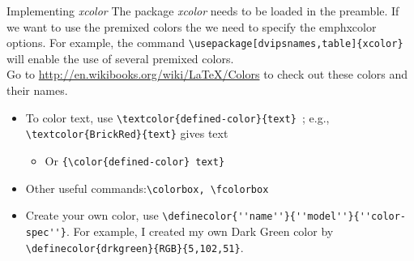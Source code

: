 \documentclass{beamer}\usepackage[]{graphicx}\usepackage[]{color}
\begin{document}
\begin{frame}[fragile]{Implementing \emph{\textrm{xcolor}}}
\textrm{The package \emph{\textrm{xcolor}} needs to be loaded in the preamble. If we want to use the premixed colors the we need to specify the emph{\textrm{xcolor}} options. For example, the command}  \verb=\usepackage[dvipsnames,table]{xcolor}= \textrm{will enable the use of several premixed colors. \\
Go to \url{http://en.wikibooks.org/wiki/LaTeX/Colors} to check out these colors and their names.}

\begin{itemize}
  \item To color text, use \verb=\textcolor{defined-color}{text} =; e.g., \verb=\textcolor{BrickRed}{text}= gives \textcolor{BrickRed}{text}
   \begin{itemize}
      \item Or \verb={\color{defined-color} text} =
   \end{itemize}
  \item Other useful commands:\verb=\colorbox, \fcolorbox =
  \item Create your own color, use \verb=\definecolor{''name''}{''model''}{''color-spec''}=. For example, I created my own Dark Green color by \verb=\definecolor{drkgreen}{RGB}{5,102,51}=.
\end{itemize}
\end{frame}
\end{document}
